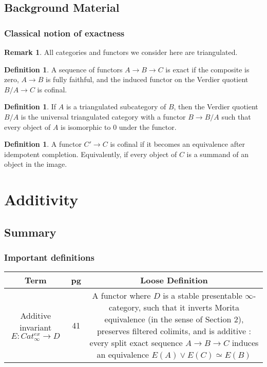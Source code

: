 \documentclass[letterpaper]{article}
\theoremstyle{definition}
\newtheorem{definition}[lemma]{Definition}
\newtheorem{remark}[lemma]{Remark}
\begin{document}
\subsection{Background Material}

\subsubsection{Classical notion of exactness}

\begin{remark}
All categories and functors we consider here are triangulated. 
\end{remark}

\begin{definition}
A sequence of functors $A \rightarrow B \rightarrow C$ is exact if the composite is zero, $A \rightarrow B$ is fully faithful, and the induced functor on the Verdier quotient $B/A \rightarrow C$ is cofinal. 
\end{definition}

\begin{definition}
If $A$ is a triangulated subcategory of $B$, then the Verdier quotient $B/A$ is the universal triangulated category with a functor $B \rightarrow B/A$ such that every object of $A$ is isomorphic to 0 under the functor. 
\end{definition}

\begin{definition}
A functor $C' \rightarrow C$ is cofinal if it becomes an equivalence after idempotent completion. Equivalently, if every object of $C$ is a summand of an object in the image. 
\end{definition}

\section{Additivity}

\subsection{Summary}

\subsubsection{Important definitions}
\begin{tabulary}{0.9\textwidth}{|C|C|C|}
\hline
Term & pg & Loose Definition\\
\hline
\hline
Additive invariant $E : Cat_\infty^{ex} \rightarrow D$ & 41 & A functor where $D$ is a stable presentable $\infty$-category, such that it inverts Morita equivalence (in the sense of Section 2), preserves filtered colimits, and is additive : every split exact sequence $A \rightarrow B \rightarrow C$ induces an equivalence $E(A) \vee E(C) \simeq E(B)$\\
\hline
\end{tabulary}
\end{document}
